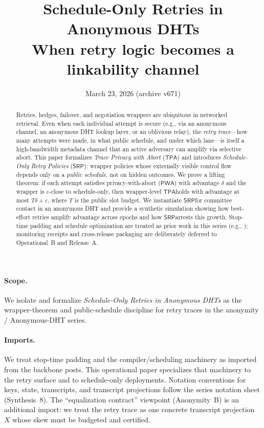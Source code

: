 \documentclass[11pt]{article}
\title{Schedule-Only Retries in Anonymous DHTs\\
\large When retry logic becomes a linkability channel}
\author{}
\date{March 23, 2026 (archive v671)}
\newcommand{\PWA}{\ensuremath{\mathsf{PWA}}}
\newcommand{\TPA}{\ensuremath{\mathsf{TPA}}}
\newcommand{\SRP}{\ensuremath{\mathsf{SRP}}}
\begin{document}
\maketitle

\begin{abstract}
Retries, hedges, failover, and negotiation wrappers are ubiquitous in networked retrieval.
Even when each individual attempt is secure (e.g., via an anonymous channel, an anonymous DHT lookup layer, or an oblivious relay),
the \emph{retry trace}---how many attempts were made, in what public schedule, and under which lane---is itself a high-bandwidth metadata channel that an active adversary can amplify via selective abort.
This paper formalizes \emph{Trace Privacy with Abort} (\TPA) and introduces \emph{Schedule-Only Retry Policies} (\SRP): wrapper policies whose externally visible control flow depends only on a \emph{public schedule}, not on hidden outcomes.
We prove a lifting theorem: if each attempt satisfies privacy-with-abort (\PWA) with advantage $\delta$ and the wrapper is $\varepsilon$-close to schedule-only, then wrapper-level \TPA holds with advantage at most $T\delta+\varepsilon$, where $T$ is the public slot budget.
We instantiate \SRP for committee contact in an anonymous DHT and provide a synthetic simulation showing how best-effort retries amplify advantage across epochs and how \SRP arrests this growth.
Stop-time padding and schedule optimization are treated as prior work in this series (e.g., \cite{series:schedcompiler,series:stoptimeaddendum}); monitoring receipts and cross-release packaging are deliberately deferred to Operational~B and Release~A.
\end{abstract}

\paragraph{Scope.}
We isolate and formalize \emph{Schedule-Only Retries in Anonymous DHTs} as the wrapper-theorem and public-schedule discipline for retry traces in the anonymity / Anonymous-DHT series.

\paragraph{Imports.}
We treat stop-time padding and the compiler/scheduling machinery as imported from the backbone posts.\cite{series:schedcompiler,series:stoptimeaddendum}
This operational paper specializes that machinery to the retry surface and to schedule-only deployments.
Notation conventions for keys, state, transcripts, and transcript projections follow the series notation sheet (Synthesis~8).\cite{series:notation}
The ``equalization contract'' viewpoint (Anonymity~B) is an additional import: we treat the retry trace as one concrete transcript projection $X$ whose skew must be budgeted and certified.\cite{series:profiling}
\end{document}
